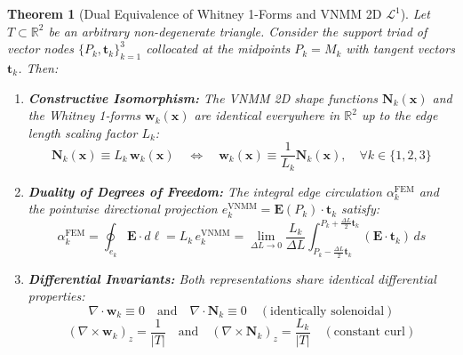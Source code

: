\documentclass[11pt,a4paper]{article}
\newtheorem{theorem}{Theorem}
\begin{document}
\begin{theorem}[Dual Equivalence of Whitney 1-Forms and VNMM 2D $\mathcal{L}^1$]
Let $T \subset \mathbb{R}^2$ be an arbitrary non-degenerate triangle. Consider the support triad of vector nodes $\{P_k, \mathbf{t}_k\}_{k=1}^3$ collocated at the midpoints $P_k = M_k$ with tangent vectors $\mathbf{t}_k$. Then:
\begin{enumerate}
    \item \textbf{Constructive Isomorphism:} The VNMM 2D shape functions $\mathbf{N}_k(\mathbf{x})$ and the Whitney 1-forms $\mathbf{w}_k(\mathbf{x})$ are identical everywhere in $\mathbb{R}^2$ up to the edge length scaling factor $L_k$:
    \begin{equation}
        \mathbf{N}_k(\mathbf{x}) \equiv L_k \, \mathbf{w}_k(\mathbf{x}) \quad \Longleftrightarrow \quad \mathbf{w}_k(\mathbf{x}) \equiv \frac{1}{L_k} \mathbf{N}_k(\mathbf{x}), \quad \forall k \in \{1, 2, 3\}
    \end{equation}
    \item \textbf{Duality of Degrees of Freedom:} The integral edge circulation $\alpha_k^{\mathrm{FEM}}$ and the pointwise directional projection $e_k^{\mathrm{VNMM}} = \mathbf{E}(P_k) \cdot \mathbf{t}_k$ satisfy:
    \begin{equation}
        \alpha_k^{\mathrm{FEM}} = \oint_{e_k} \mathbf{E} \cdot d\boldsymbol{\ell} = L_k \, e_k^{\mathrm{VNMM}} = \lim_{\Delta L \to 0} \frac{L_k}{\Delta L} \int_{P_k - \frac{\Delta L}{2}\mathbf{t}_k}^{P_k + \frac{\Delta L}{2}\mathbf{t}_k} (\mathbf{E} \cdot \mathbf{t}_k) \, ds
    \end{equation}
    \item \textbf{Differential Invariants:} Both representations share identical differential properties:
    \begin{equation}
        \nabla \cdot \mathbf{w}_k \equiv 0 \quad \text{and} \quad \nabla \cdot \mathbf{N}_k \equiv 0 \quad (\text{identically solenoidal})
    \end{equation}
    \begin{equation}
        (\nabla \times \mathbf{w}_k)_z = \frac{1}{|T|} \quad \text{and} \quad (\nabla \times \mathbf{N}_k)_z = \frac{L_k}{|T|} \quad (\text{constant curl})
    \end{equation}
\end{enumerate}
\end{theorem}
\end{document}
